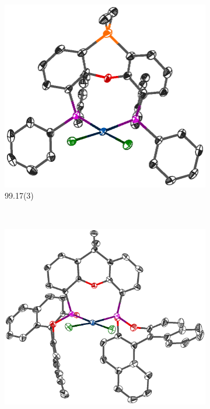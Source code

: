 \begin{figure}[htbp]
        \centering
        \begin{subfigure}[b]{0.45\textwidth}
                \includegraphics[width=\textwidth]{../Othercrystals/PtCl2/630063.eps}
                \caption{99.17(3)\degrees}
                \label{PtCl2SiPh}
        \end{subfigure}%
        ~ 
        \begin{subfigure}[b]{0.45\textwidth}
                \includegraphics[width=\textwidth]{../Othercrystals/PtCl2/295949.eps}

\end{subfigure}
\end{figure}
